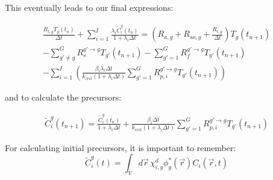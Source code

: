 \documentclass[12pt]{report}
\begin{document}
		This eventually leads to our final expressions:
		
		\begin{eqnarray} 
		\frac{R_{t,g} T_g(t_{n})}{\Delta t} + \sum_{i=1}^{I} \frac{\lambda_i \tilde{C}_i^g(t_{n})}{1+\lambda_i \Delta t} = \left( R_{a,g} + R_{so,g} + \frac{R_{t,g}}{\Delta t} \right) T_g(t_{n+1}) \nonumber \\ - \sum_{g'\neq g}^{G} R_s^{g' \rightarrow g} T_{g'}(t_{n+1}) - \sum_{g'=1}^{G} R_f^{g' \rightarrow g} T_{g'}(t_{n+1}) \nonumber \\ - \sum_{i=1}^{I} \left( \frac{\beta_i \lambda_i \Delta t}{k_{crit}\left(1+\lambda_i \Delta t \right)} \sum_{g'=1}^{G} R_{p,i}^{g' \rightarrow g} T_{g'}(t_{n+1}) \right)
		\end{eqnarray}	
		
		and to calculate the precursors:
	
	\begin{eqnarray}
	\tilde{C}_i^g(t_{n+1}) = \frac{\tilde{C}_i^g(t_{n})}{1+\lambda_i \Delta t}  + \frac{\beta_i \Delta t}{k_{crit}\left(1+\lambda_i \Delta t\right)} \sum_{g'=1}^{G} R_{p,i}^{g' \rightarrow g} T_{g'}(t_{n+1})
	\end{eqnarray}
	
	For calculating initial precursors, it is important to remember:
	\begin{equation}
	\tilde{C}_i^g(t) = \int_{V} d\vec{r} \, \chi^d_{i,g} \phi_g^*(\vec{r}) C_i(\vec{r},t) 
	\end{equation}
			
		
		
\end{document}
